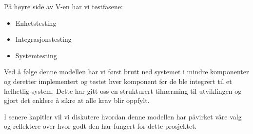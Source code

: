 På høyre side av V-en har vi testfasene:
\begin{itemize}
    \item Enhetstesting
    \item Integrasjonstesting
    \item Systemtesting
\end{itemize}

Ved å følge denne modellen har vi først brutt ned systemet i mindre komponenter og deretter implementert og testet hver komponent før de ble integrert til et helhetlig system. Dette har gitt oss en strukturert tilnærming til utviklingen og gjort det enklere å sikre at alle krav blir oppfylt.

I senere kapitler vil vi diskutere hvordan denne modellen har påvirket våre valg og reflektere over hvor godt den har fungert for dette prosjektet.
